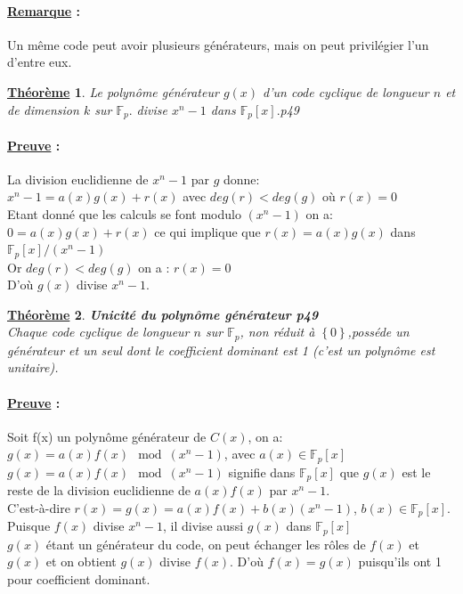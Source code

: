 \documentclass[12pt,openany]{report}
\newtheorem{theorem}{\underline{Théorème}}
\begin{document}
\paragraph{\underline{Remarque} :\\}
Un même code peut avoir plusieurs générateurs, mais on peut privilégier l'un d'entre eux.
\begin{theorem}
Le polynôme générateur $g(x)$ d'un code cyclique de longueur $n$ et de dimension $k$ sur $\mathbb{F}_{p}.$ divise $x^n-1 $
dans $\mathbb{F}_{p}[x].$\cite{M.Ibrahima_Mbaye}p49
\end{theorem}

\paragraph{\underline{Preuve} :\\}
La division euclidienne de $x^n-1$ par $g$ donne:\\
$x^n-1=a(x)g(x)+r(x)$ avec $deg(r)<deg(g) $ où $r(x)=0$\\
Etant donné que les calculs se font modulo $(x^n-1)$ on a:\\
$0=a(x)g(x)+r(x)$ ce qui implique que $r(x)=a(x)g(x)$ dans 
$\mathbb{F}_{p}[x]/(x^n-1)$\\
Or $deg(r)<deg(g) $ on a : $r(x)=0$\\
D'où $g(x)$ divise $x^n-1$.
\begin{theorem} \textbf{Unicité du polynôme générateur \cite{M.Ibrahima_Mbaye}p49}\\
Chaque code cyclique de longueur $n$ sur $\mathbb{F}_{p}$, non réduit à $ \left\lbrace 0\right\rbrace  $,posséde un générateur et un seul dont le coefficient dominant est 1 (c'est un polynôme est unitaire).

\end{theorem}

\paragraph{\underline{Preuve} :\\}

Soit f(x) un polynôme générateur de $\mathit{C}(x)$, on a: \\
$g(x)=a(x)f(x)\mod(x^n-1)$, avec $a(x) \in \mathbb{F}_{p}[x]   $\\
$g(x)=a(x)f(x)\mod(x^n-1)$ signifie dans $\mathbb{F}_{p}[x]  $ que $g(x)$ est le reste de la division euclidienne de $a(x)f(x)$ par $x^n-1$.\\
C'est-à-dire $r(x)=g(x)=a(x)f(x)+b(x)(x^n-1)$, $b(x)\in \mathbb{F}_{p}[x].$\\   
Puisque $f(x)$ divise $x^n-1$, il divise aussi $g(x)$ dans $ \mathbb{F}_{p}[x]$\\
$g(x)$ étant un générateur du code, on peut échanger les rôles de $f(x)$ et $g(x)$ et on obtient $g(x)$ divise $f(x)$.
D'où $f(x)=g(x)$ puisqu'ils ont 1 pour coefficient dominant.\\
\end{document}
